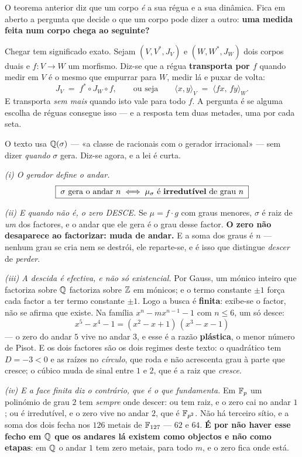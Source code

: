 \documentclass[livro.tex]{subfiles}
\begin{document}
\noindent O teorema anterior diz que um corpo \emph{é} a sua régua e a sua dinâmica. Fica em aberto
a pergunta que decide o que um corpo pode dizer a outro: \textbf{uma medida feita num corpo chega ao
seguinte?}

\medskip
\noindent Chegar tem significado exato. Sejam $(V,V^{*},J_{V})$ e $(W,W^{*},J_{W})$ dois corpos duais
e $f\colon V\to W$ um morfismo. Diz-se que a régua \textbf{transporta por $f$} quando medir em $V$ é o
mesmo que empurrar para $W$, medir lá e puxar de volta:
\[
J_{V} \;=\; f^{*}\circ J_{W}\circ f,
\qquad\text{ou seja}\qquad
\langle x,y\rangle_{V}\;=\;\langle fx,\,fy\rangle_{W}.
\]
E transporta \emph{sem mais} quando isto vale para todo $f$. A pergunta é se alguma escolha de réguas
consegue isso --- e a resposta tem duas metades, uma por cada seta.

\begin{teorema}\label{thm:gerador-andar}
O texto usa $\mathbb Q(\sigma)$ --- «a classe de racionais com o gerador irracional» --- sem dizer
\emph{quando} $\sigma$ gera. Diz-se agora, e a lei é curta.

\emph{(i) O gerador define o andar.}
\[
\boxed{\;\sigma\ \text{gera o andar } n
\iff \mu_\sigma\ \text{é \textbf{irredutível} de grau } n\;}
\]

\emph{(ii) E quando não é, o zero DESCE.} Se $\mu=f\cdot g$ com graus menores, $\sigma$ é
raiz de \emph{um} dos factores, e o andar que ele gera é o grau desse factor. \textbf{O
zero não desaparece ao factorizar: muda de andar.} E a soma dos graus é $n$ --- nenhum grau
se cria nem se destrói, ele reparte-se, e é isso que distingue \emph{descer} de
\emph{perder}.

\emph{(iii) A descida é efectiva, e não só existencial.} Por Gauss, um mónico inteiro que
factoriza sobre $\mathbb Q$ factoriza sobre $\mathbb Z$ em mónicos; e o termo constante $\pm1$ força cada
factor a ter termo constante $\pm1$. Logo a busca é \textbf{finita}: exibe-se o factor, não
se afirma que existe. Na família $x^{n}-mx^{n-1}-1$ com $n\leq6$, um só desce:
\[
\boxed{\;x^{5}-x^{4}-1=(x^{2}-x+1)\,(x^{3}-x-1)\;}
\]
--- o zero do andar $5$ vive no andar $3$, e esse é a razão \textbf{plástica}, o menor
número de Pisot. E os dois factores são os dois regimes deste texto: o quadrático tem
$D=-3<0$ e as raízes no \emph{círculo}, que roda e não acrescenta grau à parte que cresce;
o cúbico muda de sinal entre $1$ e $2$, que é a raiz que \emph{cresce}.

\emph{(iv) E a face finita diz o contrário, que é o que fundamenta.} Em $\mathbb F_p$ um polinómio
de grau $2$ tem \emph{sempre} onde descer: ou tem raiz, e o zero cai no andar $1$; ou é
irredutível, e o zero vive no andar $2$, que é $\mathbb F_{p^{2}}$. Não há terceiro sítio, e a soma
dos dois fecha nos $126$ metais de $\mathbb F_{127}$ --- $62$ e $64$. \textbf{É por não haver esse
fecho em $\mathbb Q$ que os andares lá existem como objectos e não como etapas}: em $\mathbb Q$ o andar
$1$ tem zero metais, para todo $m$, e o zero fica onde está.


\end{teorema}
\end{document}
